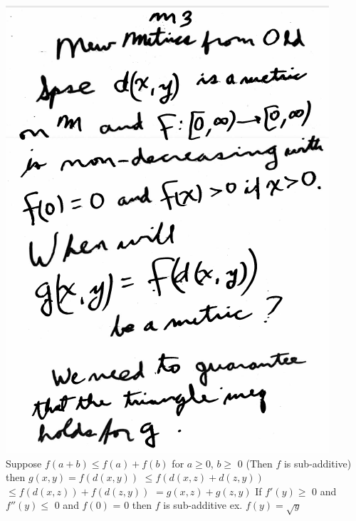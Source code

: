 \documentclass[10pt,a4paper]{article}
\begin{document}
{{\includegraphics[scale=.5]{Pages/MS_2_im3}
\newpage
Suppose $f(a+b)\leq f(a)+f(b)$
\newline
for $a\geq$0, $b\geq$ 0 (Then $f$ is sub-additive)
\newline 
then
\newline
$g(x,y)=f(d(x,y))$
\newline
$\leq f(d(x,z)+d(z,y))$
\newline
$\leq f(d(x,z))+f(d(z,y))$
\newline
$=g(x,z)+g(z,y)$
\newline
If $f'(y) \geq$ 0 and $f ''(y)\leq$ 0 and $f(0)$ = 0 then $f$ is sub-additive
\newline
ex. $f(y)=\sqrt{y}$
\newline
}}
\end{document}
